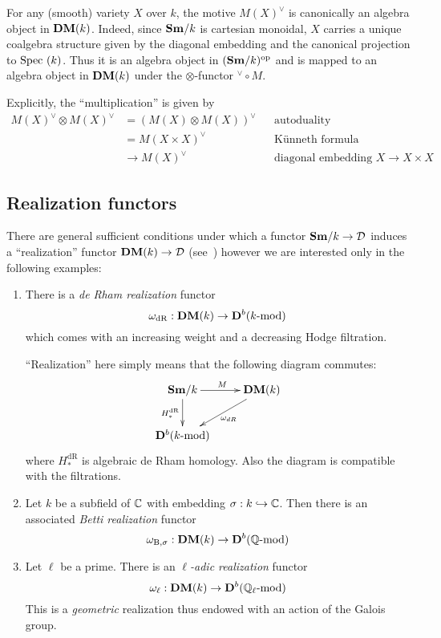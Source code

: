 \begin{exam}
  For any (smooth) variety $X$ over $k$, the motive $M(X)^{\vee}$ is
  canonically an algebra object in $\mathbf{DM}(k)$. Indeed, since $\mathbf{Sm}/k$ is
  cartesian monoidal, $X$ carries a unique coalgebra structure given
  by the diagonal embedding and the canonical projection to
  $\mathrm{Spec}~(k)$. Thus it is an algebra object in $(\mathbf{Sm}/k)^{\mathrm{op}}$
  and is mapped to an algebra object in $\mathbf{DM}(k)$ under the
  $\otimes$-functor $^{\vee}\circ M$.

  Explicitly, the ``multiplication'' is \eg{} given by
  \begin{align*}
    M(X)^{\vee} \otimes M(X)^{\vee} &= (M(X) \otimes
    M(X))^{\vee}&&\text{autoduality}\\
    &= M(X \times X)^{\vee} &&\text{Künneth formula}\\
    &\to M(X)^{\vee}&&\text{diagonal embedding } X\to X\times X
  \end{align*}
\end{exam}

\subsection{Realization functors}
There are general sufficient conditions under which a functor
$\mathbf{Sm}/k\to {\cal D}$ induces a ``realization'' functor $\mathbf{DM}(k)\to{\cal
  D}$ (see~\cite{huber00-realization}) however we are interested only
in the following examples:
\begin{exam}
  \begin{enumerate}
  \item There is a \emph{de Rham realization} functor
    \begin{equation*}
    \omega_{\mathrm{dR}} : \mathbf{DM}(k) \to \mathbf{D}^b(k\text{-}\mathrm{mod})
  \end{equation*}
  which comes with an increasing weight and a decreasing Hodge
  filtration.

  ``Realization'' here simply means that the following diagram
  commutes: 
  \begin{equation*}
    \xymatrix{
      \Sm/k \ar[r]^{M} \ar[d]_{H_{*}^{\textrm{dR}}} & \DM(k) \ar[dl]^{\omega_{dR}} \\
      \D^b(k\Mod)
    }
  \end{equation*}
  where $H_{*}^{\mathrm{dR}}$ is algebraic de Rham homology. Also the
  diagram is compatible with the filtrations.
\item Let $k$ be a subfield of $\mathbb{C}$ with embedding $\sigma : k \hookrightarrow
  \mathbb{C}$. Then there is an associated \emph{Betti realization} functor
  \begin{equation*}
    \omega_{\mathrm{B},\sigma} : \mathbf{DM}(k) \to \mathbf{D}^b(\mathbb{Q}\text{-}\mathrm{mod})
  \end{equation*}
\item Let $\ell$ be a prime. There is an \emph{$\ell$-adic
    realization} functor
  \begin{equation*}
    \omega_{\ell} : \mathbf{DM}(k) \to \mathbf{D}^b(\mathbb{Q}_{\ell}\text{-}\mathrm{mod})
  \end{equation*}
  This is a \emph{geometric} realization thus endowed with an action
  of the Galois group.
\end{enumerate}
\end{exam}

